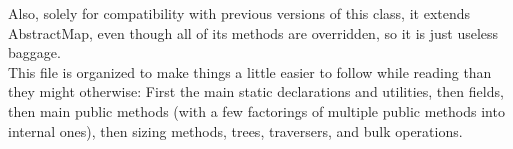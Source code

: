 \documentclass[UTF8,11pt]{ctexbook}
\begin{document}
	Also, solely for compatibility with previous versions of this
	class, it extends AbstractMap, even though all of its methods
	are overridden, so it is just useless baggage.\\
	
	This file is organized to make things a little easier to follow
	while reading than they might otherwise: First the main static
	declarations and utilities, then fields, then main public
	methods (with a few factorings of multiple public methods into
	internal ones), then sizing methods, trees, traversers, and
	bulk operations.\\
	
	
\end{document}
